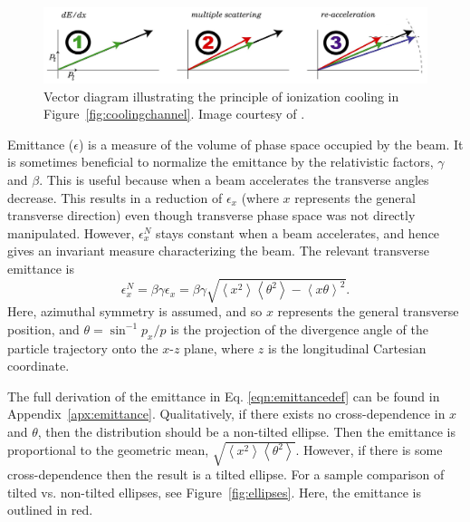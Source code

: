 \begin{figure}
  \centering
   \captionsetup{singlelinecheck=off}
    \includegraphics[width=\textwidth]{Figures/123ionization} 
  \caption{Vector diagram illustrating the principle of ionization cooling in Figure~\ref{fig:coolingchannel}. Image courtesy of \cite{MICE_repository}.}
  \label{fig:123ionization}
\end{figure}


\par
Emittance ($\epsilon$) is a measure of the volume of phase space occupied by the beam. It is sometimes beneficial to normalize the emittance by the relativistic factors, $\gamma$ and $\beta$. This is useful because when a beam accelerates the transverse angles decrease. This results in a  reduction of $\epsilon_x$ (where $x$ represents the general transverse direction) even though transverse phase space was not directly manipulated. However, $\epsilon_x ^N$ stays constant when a beam accelerates, and hence gives an invariant measure characterizing the beam. The relevant transverse emittance is
%
\begin{equation}
\label{eqn:emittancedef}
\epsilon_x^N=\beta\gamma\epsilon_x=\beta\gamma\sqrt{\left<x^2\right>\left<\theta^2\right>-\left<x\theta\right>^2}.
\end{equation}
%
Here, azimuthal symmetry is assumed, and so $x$ represents the general transverse position, and $\theta =\sin^{-1} p_x/p$ is the projection of the divergence angle of the particle trajectory onto the $x$-$z$ plane, where $z$ is the longitudinal Cartesian coordinate. 

The full derivation of the emittance in Eq. \eqref{eqn:emittancedef} can be found in Appendix~\ref{apx:emittance}. Qualitatively, if there exists no cross-dependence in $x$ and $\theta$, then the distribution should be a non-tilted ellipse. Then the emittance is proportional to the geometric mean, $\sqrt{\left<x^2\right>\left<\theta^2\right>}$. However, if there is some cross-dependence then the result is a tilted ellipse. For a sample comparison of tilted vs. non-tilted ellipses, see Figure~\ref{fig:ellipses}. Here, the emittance is outlined in red.

